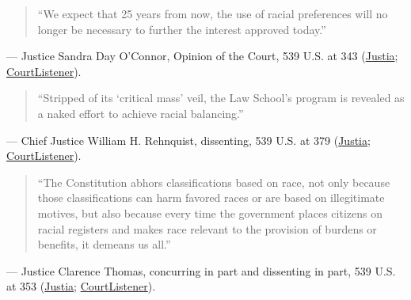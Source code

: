 \documentclass[12pt]{article}
\begin{document}
\begin{quote}
``We expect that 25 years from now, the use of racial preferences will no longer be necessary to further the interest approved today.''
\end{quote}
\noindent --- Justice Sandra Day O'Connor, Opinion of the Court, 539 U.S. at 343 (\href{https://supreme.justia.com/cases/federal/us/539/306/}{Justia}; \href{https://www.courtlistener.com/opinion/130155/grutter-v-bollinger/}{CourtListener}).

\begin{quote}
``Stripped of its `critical mass' veil, the Law School's program is revealed as a naked effort to achieve racial balancing.''
\end{quote}
\noindent --- Chief Justice William H. Rehnquist, dissenting, 539 U.S. at 379 (\href{https://supreme.justia.com/cases/federal/us/539/306/}{Justia}; \href{https://www.courtlistener.com/opinion/130155/grutter-v-bollinger/}{CourtListener}).

\begin{quote}
``The Constitution abhors classifications based on race, not only because those classifications can harm favored races or are based on illegitimate motives, but also because every time the government places citizens on racial registers and makes race relevant to the provision of burdens or benefits, it demeans us all.''
\end{quote}
\noindent --- Justice Clarence Thomas, concurring in part and dissenting in part, 539 U.S. at 353 (\href{https://supreme.justia.com/cases/federal/us/539/306/}{Justia}; \href{https://www.courtlistener.com/opinion/130155/grutter-v-bollinger/}{CourtListener}).
\end{document}
